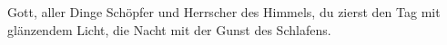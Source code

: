 \newpage


\def\greinitialformat#1{{\fontsize{40}{40}\selectfont #1}}
\gresetfirstlineaboveinitial{\small \textcolor{red}{hieme}}{}
\setaboveinitialseparation{0.72mm}

\medskip

\begin{sloppypar}
{\noindent\rm{ Gott, aller Dinge Schöpfer und Herrscher des Himmels,
du zierst den Tag mit glänzendem Licht, die Nacht mit der Gunst des Schlafens.}}
\end{sloppypar}

\medskip


